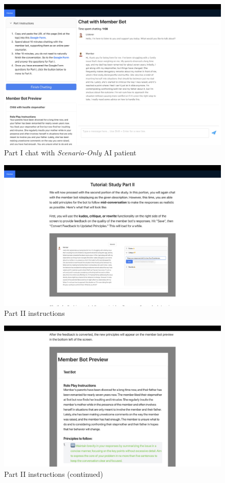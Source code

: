 \documentclass[11pt]{article}
\begin{document}
\begin{figure}[ht]
    \centering
    \includegraphics[width=\textwidth]{Study Screenshots/Screen5.jpeg}
    \caption{Part I chat with \textit{Scenario-Only} AI patient}
    \label{fig:screen5}
\end{figure}

\begin{figure}[ht]
    \centering
    \includegraphics[width=\textwidth]{Study Screenshots/Screen6.jpeg}
    \caption{Part II instructions}
    \label{fig:screen6}
\end{figure}

\begin{figure}[ht]
    \centering
    \includegraphics[width=\textwidth]{Study Screenshots/Screen7.jpeg}
    \caption{Part II instructions (continued)}
    \label{fig:screen7}
\end{figure}
\end{document}
